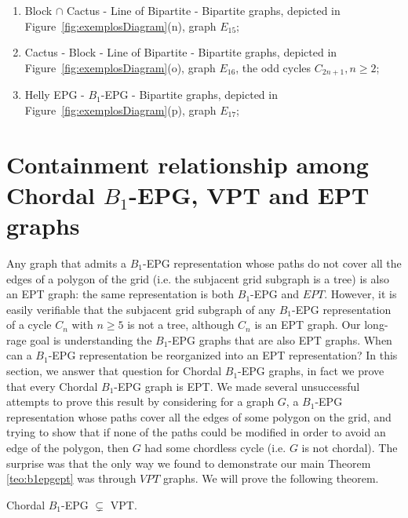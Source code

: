 \begin{enumerate}[label=(\arabic*)]
      \item Block $\cap$  Cactus -  Line of Bipartite - Bipartite graphs, depicted in Figure~\ref{fig:exemplosDiagram}(n), graph $E_{15}$;%
      \item Cactus - Block -  Line of Bipartite - Bipartite graphs, depicted in Figure~\ref{fig:exemplosDiagram}(o), graph $E_{16}$, the odd cycles $C_{2n+1},n\geq 2$;%
      \item Helly EPG - $B_1$-EPG  - Bipartite graphs, depicted in Figure~\ref{fig:exemplosDiagram}(p), graph  $E_{17}$;%
\end{enumerate}








\section{Containment relationship among Chordal $B_1$-EPG, VPT and EPT graphs }


 Any graph that
admits a $B_1$-EPG representation  whose paths do not cover all the edges of a polygon of the grid (i.e.
the subjacent grid subgraph is a tree)  is also an EPT graph: the same representation is both $B_1$-EPG and $EPT$.
However, it is easily verifiable that the subjacent grid subgraph of any $B_1$-EPG representation of a cycle $C_n$ with $n\geq 5$ is not a tree,
although $C_n$ is an  EPT graph.  Our long-rage goal is 
understanding the $B_1$-EPG graphs that are also EPT graphs. When can a $B_1$-EPG representation
be reorganized into an EPT representation?  In this section,
 we answer that question for Chordal $B_1$-EPG graphs, in fact we prove that every Chordal $B_1$-EPG graph is EPT. We
 made several unsuccessful attempts to prove this result by considering for a graph $G$, a $B_1$-EPG representation whose paths cover all the edges
 of some polygon on the grid, and trying  to show  that if none of the paths could be modified in order to avoid an edge of the polygon,
 then $G$ had some chordless  cycle (i.e. $G$ is not chordal). The surprise was that the only way we found to demonstrate our main Theorem \ref{teo:b1epgept} was through $VPT$ graphs.
 We will prove the following theorem.

\begin{theorem}\label{teo:chordalB1inVPT}
Chordal $B_1$-EPG $\subsetneq$ VPT. 
\end{theorem}


